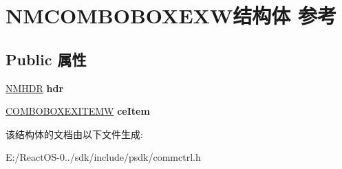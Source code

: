 \hypertarget{struct_n_m_c_o_m_b_o_b_o_x_e_x_w}{}\section{N\+M\+C\+O\+M\+B\+O\+B\+O\+X\+E\+X\+W结构体 参考}
\label{struct_n_m_c_o_m_b_o_b_o_x_e_x_w}
\subsection*{Public 属性}
\begin{DoxyCompactItemize}
\item 
\mbox{\label{struct_n_m_c_o_m_b_o_b_o_x_e_x_w_a92e01ecccc05fc95428bff6ff1254f80}} 
\hyperlink{structtag_n_m_h_d_r}{N\+M\+H\+DR} {\bfseries hdr}
\item 
\mbox{\label{struct_n_m_c_o_m_b_o_b_o_x_e_x_w_a0ef8c43958244f62f2bbe4d3e922fb69}} 
\hyperlink{structtag_c_o_m_b_o_b_o_x_e_x_i_t_e_m_w}{C\+O\+M\+B\+O\+B\+O\+X\+E\+X\+I\+T\+E\+MW} {\bfseries ce\+Item}
\end{DoxyCompactItemize}


该结构体的文档由以下文件生成\+:\begin{DoxyCompactItemize}
\item 
E\+:/\+React\+O\+S-\/0../sdk/include/psdk/commctrl.\+h\end{DoxyCompactItemize}
